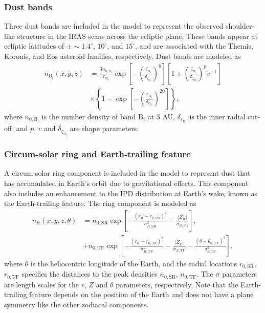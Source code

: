 \documentclass[twocolumn]{aa}
\begin{document}
\subsubsection{Dust bands}
Three dust bands are included in the model to represent the observed 
shoulder-like structure in the IRAS scans across the ecliptic plane. 
These bands appear at ecliptic latitudes of 
$\pm \sim 1.4^\circ$, $10^\circ$, and $15^\circ$, and are associated 
with the Themis, Koronis, and Eos asteroid families, respectively. Dust 
bands are modeled as
\begin{align}
    n_{\mathrm{B}_i}(x,y,z) &= \frac{3 n_{0, \mathrm{B}_i}}{r_{\mathrm{B}_i}} \exp \left[-\left(\frac{\zeta_{\mathrm{B}_i}}{\delta_{\zeta_{\mathrm{B}_i}}}\right)^{6}\right]\left[1 + \left(\frac{\zeta_{\mathrm{B}_i}}{\delta_{\zeta_{\mathrm{B}_i}}}\right)^{p}v^{-1}\right] \\
    &\times\left\{1-\exp \left[-\left(\frac{r_{\mathrm{B}_i}}{\delta_{r_{\mathrm{B}_i}}}\right)^{20}\right]\right\},
\end{align}
where $n_{0, \mathrm{B}_i}$ is the number density of band $\mathrm{B}_i$ 
at 3 AU, $\delta_{r_{\mathrm{B}_i}}$ is the inner radial cut-off, and 
$p$, $v$ and $\delta_{\zeta_{\mathrm{B}_i}}$ are shape parameters.
\subsubsection{Circum-solar ring and Earth-trailing feature}
A circum-solar ring component is included in the model to represent dust 
that has accumulated in Earth's orbit due to gravitational effects. This 
component also includes an enhancement to the IPD distribution at 
Earth's wake, known as the Earth-trailing feature. The ring component is 
modeled as
\begin{align}
    n_\mathrm{R}(x, y, z, \theta)&=n_{0, \mathrm{SR}} \exp \left[-\frac{\left(r_\mathrm{R}-r_{0, \mathrm{SR}}\right)^2}{\sigma_{R,\mathrm{SR}} ^2}-\frac{\left| Z_\mathrm{R} \right|}{\sigma_{Z, \mathrm{SR}}}\right],\\
   &+ n_{0, \mathrm{TF}} \exp \left[-\frac{\left(r_\mathrm{R}-r_{0, \mathrm{TF}}\right)^{2}}{\sigma_{R, \mathrm{TF}}^{2}}-\frac{\left|Z_\mathrm{F}\right|}{\sigma_{Z, \mathrm{TF}}}-\frac{\left(\theta-\theta_{0, \mathrm{TF}}\right)^{2}}{\sigma_{\theta,\mathrm{TF}}^{2}}\right],
\end{align}
where $\theta$ is the heliocentric longitude of the Earth, and the 
radial locations $r_{0, \mathrm{SR}}$, $r_{0, \mathrm{TF}}$ specifies 
the distances to the peak densities $n_{0, \mathrm{SR}}$, 
$n_{0, \mathrm{TF}}$. The $\sigma$ parameters are length scales for the 
$r$, $Z$ and $\theta$ parameters, respectively. Note that the 
Earth-trailing feature depends on the position of the Earth and does not 
have a plane symmetry like the other zodiacal components. 
\end{document}
